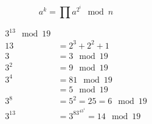 \begin{algorithm}
\[a^k = \prod a^{2^i} \mod n\]
\end{algorithm}

\begin{exmp}
    \begin{align*}
        3^{13} \mod 19 \\
        13 &= 2^3 +2 ^2 +1\\
        3 &= 3 \mod 19\\
        3^2 &= 9 \mod 19\\
        3^4 &= 81 \mod 19\\
        &= 5 \mod 19\\
        3^8 &= 5^2 = 25 = 6 \mod 19\\
        3^{13} &= 3^83^43^1 = 14 \mod 19
    \end{align*}    
\end{exmp}
